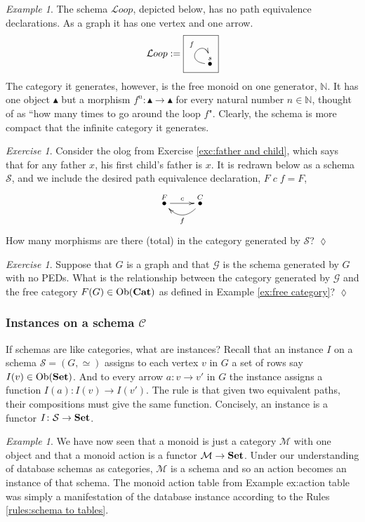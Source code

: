 \documentclass{book}
\makeatletter
\def\tn{\textnormal}
\def\mc{\mathcal}
\def\NN{{\mathbb N}}
\def\Ob{\tn{Ob}}
\def\to{\rightarrow}
\def\taking{\colon}
\newcommand{\LMO}[1]{\stackrel{#1}{\bullet}}
\def\monOb{\blacktriangle}
\def\Cat{{\bf Cat}}
\def\Set{{\bf Set}}
\def\mcC{\mc{C}}
\def\mcG{\mc{G}}
\def\mcL{\mc{L}}
\def\mcM{\mc{M}}
\def\mcS{\mc{S}}
\def\Loop{{\mcL oop}}
\def\LoopSchema{{\parbox{.5in}{\fbox{\xymatrix{\LMO{s}\ar@(l,u)[]^f}}}}}
\theoremstyle{remark}
\newtheorem{example}[subsubsection]{Example}
\newtheorem{exc}[subsubsection]{Exercise}
\newenvironment{exercise}{\begin{exc}}{\hspace*{\fill}$\lozenge$\end{exc}}
\theoremstyle{definition}
\makeatother
\begin{document}
\begin{example}

The schema $\Loop$, depicted below, has no path equivalence declarations. As a graph it has one vertex and one arrow.
$$\Loop:=\LoopSchema$$ 
The category it generates, however, is the free monoid on one generator, $\NN$. It has one object $\monOb$ but a morphism $f^n\taking\monOb\to\monOb$ for every natural number $n\in\NN$, thought of as ``how many times to go around the loop $f$". Clearly, the schema is more compact that the infinite category it generates.

\end{example}

\begin{exercise}
Consider the olog from Exercise \ref{exc:father and child}, which says that for any father $x$, his first child's father is $x$. It is redrawn below as a schema $\mcS$, and we include the desired path equivalence declaration, $F\;c\;f=F$,
$$
\xymatrix{\LMO{F}\ar[r]^c&\LMO{C}\ar@/^1pc/[l]^f}
$$ 
How many morphisms are there (total) in the category generated by $\mcS$?
\end{exercise}

\begin{exercise}
Suppose that $G$ is a graph and that $\mcG$ is the schema generated by $G$ with no PEDs. What is the relationship between the category generated by $\mcG$ and the free category $F(G)\in\Ob(\Cat)$ as defined in Example \ref{ex:free category}?
\end{exercise}


\subsubsection{Instances on a schema $\mcC$}\label{sec:instances}

If schemas are like categories, what are instances? Recall that an instance $I$ on a schema $\mcS=(G,\simeq)$ assigns to each vertex $v$ in $G$ a set of rows say $I(v)\in\Ob(\Set)$. And to every arrow $a\taking v\to v'$ in $G$ the instance assigns a function $I(a)\taking I(v)\to I(v')$. The rule is that given two equivalent paths, their compositions must give the same function. Concisely, an instance is a functor $I\taking\mcS\to\Set$. 

\begin{example}

We have now seen that a monoid is just a category $\mcM$ with one object and that a monoid action is a functor $\mcM\to\Set$. Under our understanding of database schemas as categories, $\mcM$ is a schema and so an action becomes an instance of that schema. The monoid action table from Example {ex:action table} was simply a manifestation of the database instance according to the Rules \ref{rules:schema to tables}.

\end{example}
\end{document}
